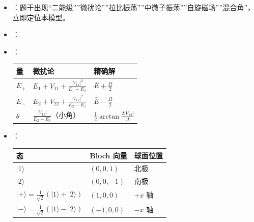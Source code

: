 \begin{tipbox}[快速识别与解题技巧]
\begin{itemize}
    \item {}：题干出现``二能级''''微扰论''''拉比振荡''''中微子振荡''''自旋磁场''''混合角''，立即定位本模型。
    \item {}：
    \begin{center}
    \end{center}
    \item {}：
    \begin{center}
    \begin{tabular}{lll}
    \toprule
    \textbf{量} & \textbf{微扰论} & \textbf{精确解} \\
    \midrule
    $E_+$ & $E_1+V_{11}+\frac{|V_{12}|^2}{E_1-E_2}$ & $\bar{E}+\frac{\Omega}{2}$ \\
    $E_-$ & $E_2+V_{22}+\frac{|V_{12}|^2}{E_2-E_1}$ & $\bar{E}-\frac{\Omega}{2}$ \\
    $\theta$ & $\frac{|V_{12}|}{E_2-E_1}$（小角） & $\frac{1}{2}\arctan\frac{2|V_{12}|}{\Delta}$ \\
    \bottomrule
    \end{tabular}
    \end{center}
    \item {}：
    \begin{center}
    \begin{tabular}{lll}
    \toprule
    \textbf{态} & \textbf{Bloch 向量} & \textbf{球面位置} \\
    \midrule
    $|1\rangle$ & $(0,0,1)$ & 北极 \\
    $|2\rangle$ & $(0,0,-1)$ & 南极 \\
    $|+\rangle=\frac{1}{\sqrt2}(|1\rangle+|2\rangle)$ & $(1,0,0)$ & $+x$ 轴 \\
    $|-\rangle=\frac{1}{\sqrt2}(|1\rangle-|2\rangle)$ & $(-1,0,0)$ & $-x$ 轴 \\

\end{tabular}
\end{center}
\end{itemize}
\end{tipbox}
